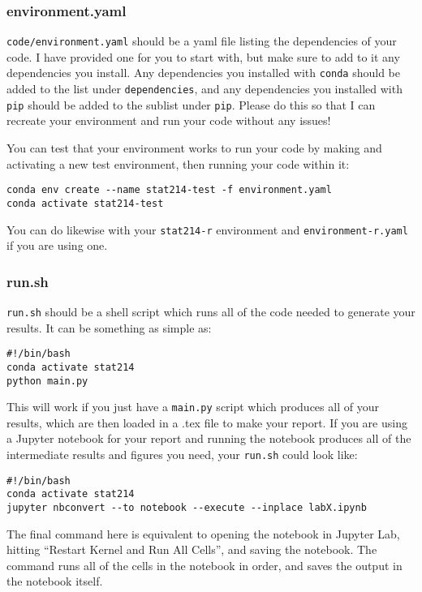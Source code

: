 \documentclass[letterpaper,12pt]{article}
\begin{document}
\subsubsection{environment.yaml}
\texttt{code/environment.yaml} should be a yaml file listing the dependencies of your code. I have provided one for you to start with, but make sure to add to it any dependencies you install. Any dependencies you installed with \texttt{conda} should be added to the list under \texttt{dependencies}, and any dependencies you installed with \texttt{pip} should be added to the sublist under \texttt{pip}. Please do this so that I can recreate your environment and run your code without any issues!

You can test that your environment works to run your code by making and activating a new test environment, then running your code within it:
\begin{verbatim}
conda env create --name stat214-test -f environment.yaml
conda activate stat214-test
\end{verbatim}
You can do likewise with your \texttt{stat214-r} environment and \texttt{environment-r.yaml} if you are using one.

\subsubsection{run.sh}
\texttt{run.sh} should be a shell script which runs all of the code needed to generate your results. It can be something as simple as:
\begin{verbatim}
#!/bin/bash
conda activate stat214
python main.py
\end{verbatim}
This will work if you just have a \texttt{main.py} script which produces all of your results, which are then loaded in a .tex file to make your report. If you are using a Jupyter notebook for your report and running the notebook produces all of the intermediate results and figures you need, your \texttt{run.sh} could look like:
\begin{verbatim}
#!/bin/bash
conda activate stat214
jupyter nbconvert --to notebook --execute --inplace labX.ipynb
\end{verbatim}
The final command here is equivalent to opening the notebook in Jupyter Lab, hitting ``Restart Kernel and Run All Cells'', and saving the notebook. The command runs all of the cells in the notebook in order, and saves the output in the notebook itself.
\end{document}
